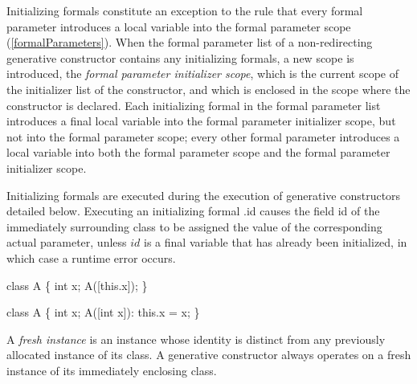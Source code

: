 \documentclass{article}
\newcommand{\code}[1]{{\sf #1}}
\begin{document}
\LMHash{}
Initializing formals constitute an exception to the rule that every formal parameter introduces a local variable into the formal parameter scope (\ref{formalParameters}).
When the formal parameter list of a non-redirecting generative constructor contains any initializing formals, a new scope is introduced, the {\em formal parameter initializer scope}, which is the current scope of the initializer list of the constructor, and which is enclosed in the scope where the constructor is declared.
Each initializing formal in the formal parameter list introduces a final local variable into the formal parameter initializer scope, but not into the formal parameter scope; every other formal parameter introduces a local variable into both the formal parameter scope and the formal parameter initializer scope.


\LMHash{}
Initializing formals are executed during the execution of generative constructors detailed below. Executing an initializing formal  \code{\THIS{}.id} causes the field \code{id} of the immediately surrounding class to be assigned the value of the corresponding actual parameter, unless $id$ is a final variable that has already been initialized, in which case a runtime error occurs.



\begin{dartCode}
class A \{
  int x;
  A([this.x]);
\}
\end{dartCode}


\begin{dartCode}
class A \{
  int x;
  A([int x]): this.x = x;
\}
\end{dartCode}

\LMHash{}
A {\em fresh instance} is an instance whose identity  is distinct from any previously allocated instance of its class. A generative constructor always operates on a fresh instance of its immediately enclosing class.
\end{document}
